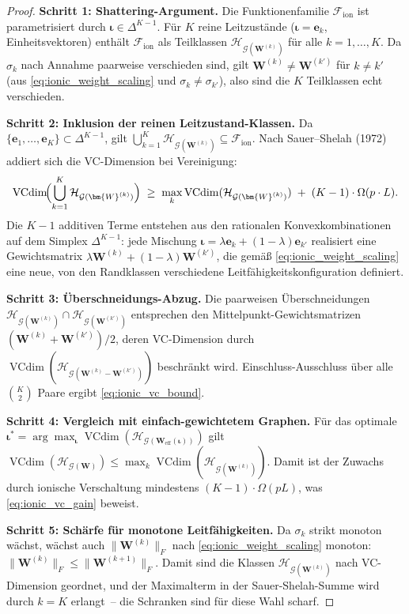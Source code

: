 \documentclass[12pt, a4paper, openany]{report}
\newcommand{\calG}{\mathcal{G}}
\newcommand{\calH}{\mathcal{H}}
\newcommand{\calF}{\mathcal{F}}
\DeclareMathOperator{\VC}{VCdim}
\begin{document}
\begin{proof}
\textbf{Schritt 1: Shattering-Argument.}
Die Funktionenfamilie $\calF_{\mathrm{ion}}$ ist parametrisiert durch
$\bm{\iota} \in \Delta^{K-1}$.  Für $K$ reine Leitzustände
($\bm{\iota} = \bm{e}_k$, Einheitsvektoren) enthält $\calF_{\mathrm{ion}}$
als Teilklassen $\calH_{\calG(\bm{W}^{(k)})}$ für alle $k = 1, \ldots, K$.
Da $\sigma_k$ nach Annahme paarweise verschieden sind, gilt
$\bm{W}^{(k)} \neq \bm{W}^{(k')}$ für $k \neq k'$
(aus \eqref{eq:ionic_weight_scaling} und $\sigma_k \neq \sigma_{k'}$),
also sind die $K$ Teilklassen echt verschieden.

\textbf{Schritt 2: Inklusion der reinen Leitzustand-Klassen.}
Da $\{\bm{e}_1, \ldots, \bm{e}_K\} \subset \Delta^{K-1}$, gilt
$\bigcup_{k=1}^K \calH_{\calG(\bm{W}^{(k)})} \subseteq \calF_{\mathrm{ion}}$.
Nach Sauer--Shelah (1972) addiert sich die VC-Dimension bei Vereinigung:
\[
  \VC\!\Bigl(\bigcup_{k=1}^K \calH_{\calG(\bm{W}^{(k)})}\Bigr)
  \;\geq\;
  \max_k \VC(\calH_{\calG(\bm{W}^{(k)})})
  \;+\;
  (K-1)\cdot \Omega(p \cdot L).
\]
Die $K-1$ additiven Terme entstehen aus den rationalen Konvexkombinationen
auf dem Simplex $\Delta^{K-1}$: jede Mischung $\bm{\iota} = \lambda\bm{e}_k +
(1-\lambda)\bm{e}_{k'}$ realisiert eine Gewichtsmatrix
$\lambda\bm{W}^{(k)} + (1-\lambda)\bm{W}^{(k')}$, die gemäß
\eqref{eq:ionic_weight_scaling} eine neue, von den Randklassen verschiedene
Leitfähigkeitskonfiguration definiert.

\textbf{Schritt 3: Überschneidungs-Abzug.}
Die paarweisen Überschneidungen $\calH_{\calG(\bm{W}^{(k)})} \cap
\calH_{\calG(\bm{W}^{(k')})}$ entsprechen den Mittelpunkt-Gewichtsmatrizen
$(\bm{W}^{(k)} + \bm{W}^{(k')})/2$, deren VC-Dimension durch
$\VC(\calH_{\calG(\bm{W}^{(k)}-\bm{W}^{(k')})})$ beschränkt wird.
Einschluss-Ausschluss über alle $\binom{K}{2}$ Paare ergibt \eqref{eq:ionic_vc_bound}.

\textbf{Schritt 4: Vergleich mit einfach-gewichtetem Graphen.}
Für das optimale $\bm{\iota}^* = \arg\max_{\bm\iota}
\VC(\calH_{\calG(\bm{W}_{\mathrm{eff}}(\bm\iota))})$ gilt
$\VC(\calH_{\calG(\bm{W})}) \leq \max_k \VC(\calH_{\calG(\bm{W}^{(k)})})$.
Damit ist der Zuwachs durch ionische Verschaltung mindestens
$(K-1)\cdot\Omega(pL)$, was \eqref{eq:ionic_vc_gain} beweist.

\textbf{Schritt 5: Schärfe für monotone Leitfähigkeiten.}
Da $\sigma_k$ strikt monoton wächst, wächst auch $\|\bm{W}^{(k)}\|_F$
nach \eqref{eq:ionic_weight_scaling} monoton: $\|\bm{W}^{(k)}\|_F \leq
\|\bm{W}^{(k+1)}\|_F$.  Damit sind die Klassen $\calH_{\calG(\bm{W}^{(k)})}$
nach VC-Dimension geordnet, und der Maximalterm in der Sauer-Shelah-Summe
wird durch $k = K$ erlangt~-- die Schranken sind für diese Wahl scharf.
\end{proof}
\end{document}
